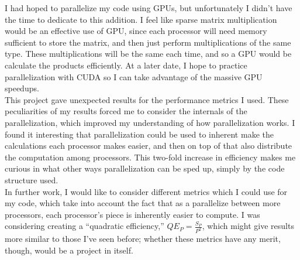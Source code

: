 \documentclass{article}
\begin{document}
I had hoped to parallelize my code using GPUs, but unfortunately I didn't have
the time to dedicate to this addition. I feel like sparse matrix multiplication
would be an effective use of GPU, since each processor will need memory
sufficient to store the matrix, and then just perform multiplications of the
same type. These multiplications will be the same each time, and so a GPU would
be calculate the products efficiently. At a later date, I hope to practice
parallelization with CUDA so I can take advantage of the massive GPU
speedups. \\

This project gave unexpected results for the performance metrics I used.
These peculiarities of my results forced me to consider the internals of the
parallelization, which improved my understanding of how parallelization works. I
found it interesting that parallelization could be used to inherent make the
calculations each processor makes easier, and then on top of that also
distribute the computation among processors. This two-fold increase in
efficiency makes me curious in what other ways parallelization can be sped up,
simply by the code structure used. \\

In further work, I would like to consider different metrics which I could use
for my code, which take into account the fact that as a parallelize between more
processors, each processor's piece is inherently easier to compute. I was
considering creating a ``quadratic efficiency,'' $QE_P=\frac{S_P}{P^2}$, which
might give results more similar to those I've seen before; whether these metrics
have any merit, though, would be a project in itself. 
\end{document}
